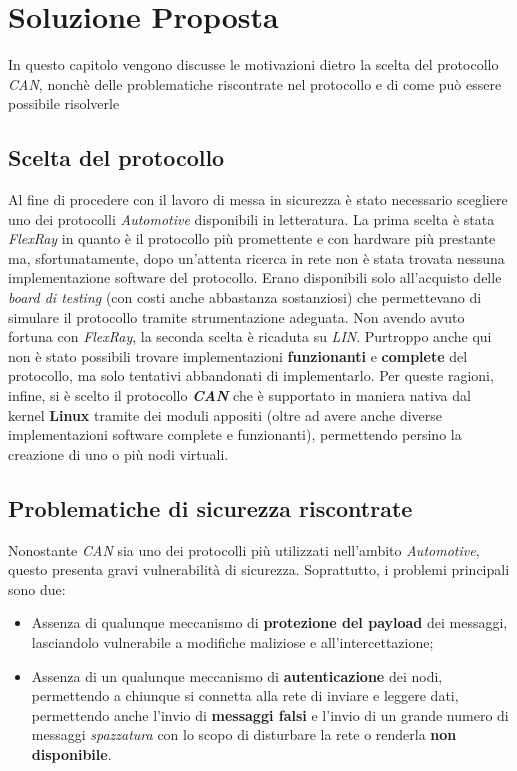 \chapter{Soluzione Proposta}

\begin{citazione}
    In questo capitolo vengono discusse le motivazioni dietro la scelta del protocollo \emph{CAN}, nonchè delle problematiche riscontrate nel protocollo e di come può essere possibile risolverle
\end{citazione}

\section{Scelta del protocollo}
Al fine di procedere con il lavoro di messa in sicurezza è stato necessario scegliere uno dei protocolli \emph{Automotive} disponibili in letteratura. La prima scelta è stata \emph{FlexRay} in quanto è il protocollo più promettente e con hardware più prestante ma, sfortunatamente, dopo un'attenta ricerca in rete non è stata trovata nessuna implementazione software del protocollo. Erano disponibili solo all'acquisto delle \emph{board di testing} (con costi anche abbastanza sostanziosi) che permettevano di simulare il protocollo tramite strumentazione adeguata. Non avendo avuto fortuna con \emph{FlexRay}, la seconda scelta è ricaduta su \emph{LIN}. Purtroppo anche qui non è stato possibili trovare implementazioni \textbf{funzionanti} e \textbf{complete} del protocollo, ma solo tentativi abbandonati di implementarlo. Per queste ragioni, infine, si è scelto il protocollo \textbf{\emph{CAN}} che è supportato in maniera nativa dal kernel \textbf{Linux} tramite dei moduli appositi (oltre ad avere anche diverse implementazioni software complete e funzionanti), permettendo persino la creazione di uno o più nodi virtuali.

\section{Problematiche di sicurezza riscontrate}
Nonostante \emph{CAN} sia uno dei protocolli più utilizzati nell'ambito \emph{Automotive}, questo presenta gravi vulnerabilità di sicurezza. Soprattutto, i problemi principali sono due:
\begin{itemize}
    \item Assenza di qualunque meccanismo di \textbf{protezione del payload} dei messaggi, lasciandolo vulnerabile a modifiche maliziose e all'intercettazione;
    \item Assenza di un qualunque meccanismo di \textbf{autenticazione} dei nodi, permettendo a chiunque si connetta alla rete di inviare e leggere dati, permettendo anche l'invio di \textbf{messaggi falsi} e l'invio di un grande numero di messaggi \emph{spazzatura} con lo scopo di disturbare la rete o renderla \textbf{non disponibile}.
\end{itemize}


